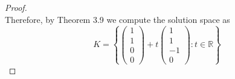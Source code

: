\documentclass[11pt]{scrartcl}
\begin{document}
\begin{enumerate}[label=\alph*.]
{\begin{proof}
$$		      $$
		      Therefore, by Theorem 3.9 we compute the solution space as
		      \[
			      K=
			      \left\{
			      \begin{pmatrix}
				      1 \\
				      1 \\
				      0 \\
				      0
			      \end{pmatrix}+
			      t\begin{pmatrix}
				      1  \\
				      1  \\
				      -1 \\
				      0
			      \end{pmatrix}: t \in \mathbb{R}
			      \right\}
		      \]
	      \end{proof}
	      }
\end{enumerate}
\end{document}
